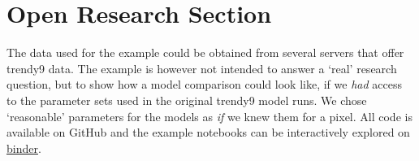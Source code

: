 





%
%

\section*{Open Research Section}
The data used for the example could be obtained from several servers that offer trendy9 data.
The example is however not intended to answer a `real' research question, but to show how a model comparison could look like,
if we \emph{had} access to the parameter sets used in the original trendy9 model runs.
We chose `reasonable' parameters for the models as \emph{if} we knew them for a pixel.
All code is available on GitHub and the example notebooks can be interactively explored on \href{https://mybinder.org/v2/gh/MPIBGC-TEE/bgc_md2/binder}{binder}.



